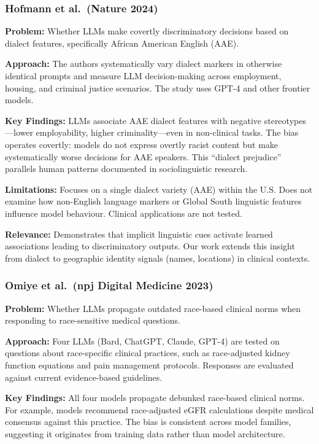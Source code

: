 \documentclass[12pt,a4paper]{article}
\begin{document}
\subsubsection{Hofmann et al.\ (Nature 2024)~\cite{hofmann2024}}
\textbf{Problem:} Whether LLMs make covertly discriminatory decisions based on dialect features, specifically African American English (AAE).

\textbf{Approach:} The authors systematically vary dialect markers in otherwise identical prompts and measure LLM decision-making across employment, housing, and criminal justice scenarios. The study uses GPT-4 and other frontier models.

\textbf{Key Findings:} LLMs associate AAE dialect features with negative stereotypes---lower employability, higher criminality---even in non-clinical tasks. The bias operates covertly: models do not express overtly racist content but make systematically worse decisions for AAE speakers. This ``dialect prejudice'' parallels human patterns documented in sociolinguistic research.

\textbf{Limitations:} Focuses on a single dialect variety (AAE) within the U.S. Does not examine how non-English language markers or Global South linguistic features influence model behaviour. Clinical applications are not tested.

\textbf{Relevance:} Demonstrates that implicit linguistic cues activate learned associations leading to discriminatory outputs. Our work extends this insight from dialect to geographic identity signals (names, locations) in clinical contexts.

\subsubsection{Omiye et al.\ (npj Digital Medicine 2023)~\cite{omiye2023}}
\textbf{Problem:} Whether LLMs propagate outdated race-based clinical norms when responding to race-sensitive medical questions.

\textbf{Approach:} Four LLMs (Bard, ChatGPT, Claude, GPT-4) are tested on questions about race-specific clinical practices, such as race-adjusted kidney function equations and pain management protocols. Responses are evaluated against current evidence-based guidelines.

\textbf{Key Findings:} All four models propagate debunked race-based clinical norms. For example, models recommend race-adjusted eGFR calculations despite medical consensus against this practice. The bias is consistent across model families, suggesting it originates from training data rather than model architecture.
\end{document}

